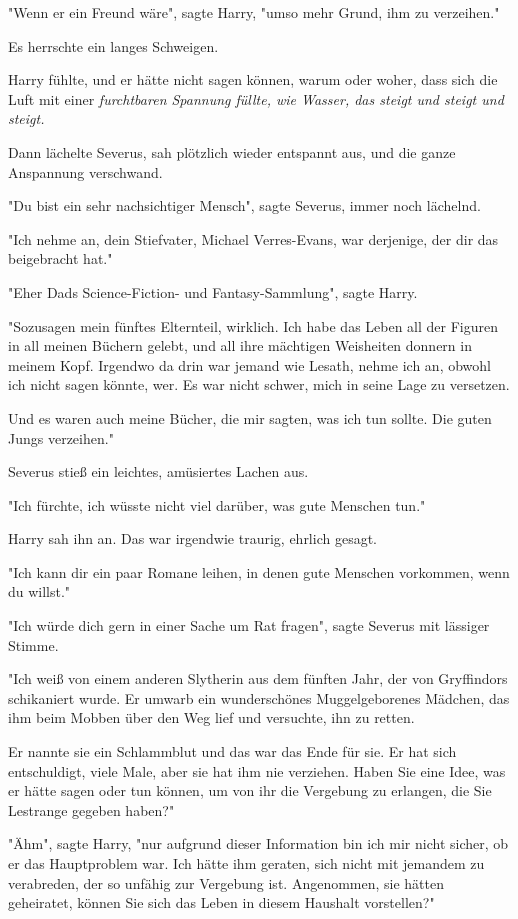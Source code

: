 {"Wenn er ein Freund wäre", sagte Harry, "umso mehr Grund, ihm zu verzeihen."

Es herrschte ein langes Schweigen.

Harry fühlte, und er hätte nicht sagen können, warum oder woher, dass sich die Luft mit einer \emph{furchtbaren Spannung füllte, wie Wasser, das steigt und steigt und steigt.}

Dann lächelte Severus, sah plötzlich wieder entspannt aus, und die ganze Anspannung verschwand.

"Du bist ein sehr nachsichtiger Mensch", sagte Severus, immer noch lächelnd.

"Ich nehme an, dein Stiefvater, Michael Verres-Evans, war derjenige, der dir das beigebracht hat."

"Eher Dads Science-Fiction- und Fantasy-Sammlung", sagte Harry.

"Sozusagen mein fünftes Elternteil, wirklich. Ich habe das Leben all der Figuren in all meinen Büchern gelebt, und all ihre mächtigen Weisheiten donnern in meinem Kopf. Irgendwo da drin war jemand wie Lesath, nehme ich an, obwohl ich nicht sagen könnte, wer. Es war nicht schwer, mich in seine Lage zu versetzen.

Und es waren auch meine Bücher, die mir sagten, was ich tun sollte. Die guten Jungs verzeihen."

Severus stieß ein leichtes, amüsiertes Lachen aus.

"Ich fürchte, ich wüsste nicht viel darüber, was gute Menschen tun."

Harry sah ihn an. Das war irgendwie traurig, ehrlich gesagt.

"Ich kann dir ein paar Romane leihen, in denen gute Menschen vorkommen, wenn du willst."

"Ich würde dich gern in einer Sache um Rat fragen", sagte Severus mit lässiger Stimme.

"Ich weiß von einem anderen Slytherin aus dem fünften Jahr, der von Gryffindors schikaniert wurde. Er umwarb ein wunderschönes Muggelgeborenes Mädchen, das ihm beim Mobben über den Weg lief und versuchte, ihn zu retten.

Er nannte sie ein Schlammblut und das war das Ende für sie. Er hat sich entschuldigt, viele Male, aber sie hat ihm nie verziehen. Haben Sie eine Idee, was er hätte sagen oder tun können, um von ihr die Vergebung zu erlangen, die Sie Lestrange gegeben haben?"

"Ähm", sagte Harry, "nur aufgrund dieser Information bin ich mir nicht sicher, ob er das Hauptproblem war. Ich hätte ihm geraten, sich nicht mit jemandem zu verabreden, der so unfähig zur Vergebung ist. Angenommen, sie hätten geheiratet, können Sie sich das Leben in diesem Haushalt vorstellen?"

}
